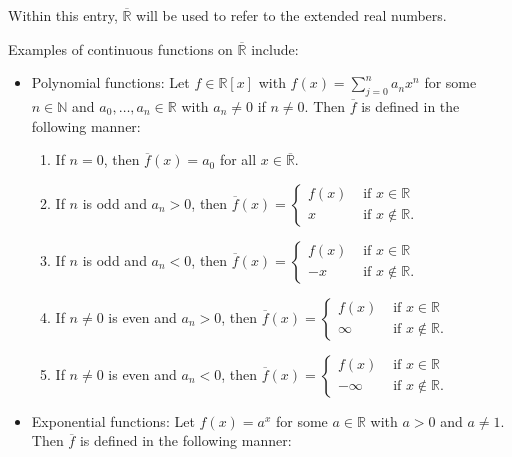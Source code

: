 \documentclass[12pt]{article}
\begin{document}
Within this entry, $\overline{\mathbb{R}}$ will be used to refer to the extended real numbers.

Examples of continuous functions on $\overline{\mathbb{R}}$ include:

\begin{itemize}

\item Polynomial functions:  Let $f \in \mathbb{R}[x]$ with $\displaystyle f(x)=\sum_{j=0}^n a_nx^n$ for some $n \in \mathbb{N}$ and $a_0, \ldots , a_n \in \mathbb{R}$ with $a_n \neq 0$ if $n \neq 0$.  Then $\overline{f}$ is defined in the following manner:

\begin{enumerate}

\item If $n=0$, then $\overline{f}(x)=a_0$ for all $x \in \overline{\mathbb{R}}$.

\item If $n$ is odd and $a_n>0$, then $\displaystyle \overline{f}(x)=\begin{cases}
f(x) & \text{ if } x \in \mathbb{R} \\
x & \text{ if } x \notin \mathbb{R}. \end{cases}$

\item If $n$ is odd and $a_n<0$, then $\displaystyle \overline{f}(x)=\begin{cases}
f(x) & \text{ if } x \in \mathbb{R} \\
-x & \text{ if } x \notin \mathbb{R}.  \end{cases}$

\item If $n \neq 0$ is even and $a_n>0$, then $\displaystyle \overline{f}(x)=\begin{cases}
f(x) & \text{ if } x \in \mathbb{R} \\
\infty & \text{ if } x \notin \mathbb{R}.  \end{cases}$

\item If $n \neq 0$ is even and $a_n<0$, then $\displaystyle \overline{f}(x)=\begin{cases}
f(x) & \text{ if } x \in \mathbb{R} \\
-\infty & \text{ if } x \notin \mathbb{R}.  \end{cases}$

\end{enumerate}

\item Exponential functions:  Let $f(x)=a^x$ for some $a \in \mathbb{R}$ with $a>0$ and $a \neq 1$.  Then $\overline{f}$ is defined in the following manner:


\end{itemize}
\end{document}
